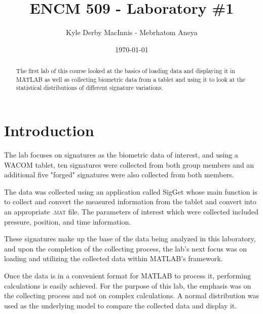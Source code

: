 \documentclass[a4paper]{article}
\title{ENCM 509 - Laboratory \#1}
\author{Kyle Derby MacInnis - Mebrhatom Aneya}
\date{\today}
\begin{document}
\maketitle

\begin{abstract}
The first lab of this course looked at the basics of loading data and displaying it in MATLAB as well as collecting biometric data from a tablet and using it to look at the statistical distributions of different signature variations.
\end{abstract}

\section{Introduction}
The lab focuses on signatures as the biometric data of interest, and using a WACOM tablet, ten signatures were collected from both group members and an additional five "forged" signatures were also collected from both members.

The data was collected using an application called SigGet whose main function is to collect and convert the measured information from the tablet and convert into an appropriate \textsc{.mat} file. The parameters of interest which were collected included pressure, position, and time information.

These signatures make up the base of the data being analyzed in this laboratory, and upon the completion  of the collecting process, the lab's next focus was on loading and utilizing the collected data within MATLAB's framework.

Once the data is in a convenient format for MATLAB to process it, performing calculations is easily achieved. For the purpose of this lab, the emphasis was on the collecting process and not on complex calculations. A normal distribution was used as the underlying model to compare the collected data and display it.

\end{document}
